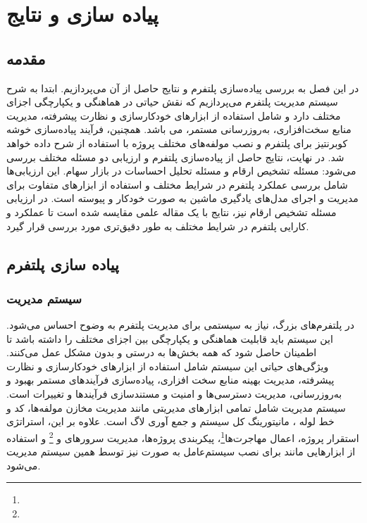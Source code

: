 \chapter{پیاده سازی و نتایج}

\section{مقدمه}
در این فصل به بررسی پیاده‌سازی پلتفرم و نتایج حاصل از آن می‌پردازیم. ابتدا به شرح سیستم مدیریت پلتفرم می‌پردازیم که نقش حیاتی در هماهنگی و یکپارچگی اجزای مختلف دارد و شامل استفاده از ابزارهای خودکارسازی و نظارت پیشرفته، مدیریت منابع سخت‌افزاری، به‌روزرسانی مستمر، می باشد. همچنین، فرآیند پیاده‌سازی خوشه کوبرنتیز برای پلتفرم  و نصب مولفه‌های مختلف پروژه با استفاده از  شرح داده خواهد شد. در نهایت، نتایج حاصل از پیاده‌سازی پلتفرم و ارزیابی دو مسئله مختلف بررسی می‌شود: مسئله تشخیص ارقام و مسئله تحلیل احساسات در بازار سهام. این ارزیابی‌ها شامل بررسی عملکرد پلتفرم در شرایط مختلف و استفاده از ابزارهای متفاوت برای مدیریت و اجرای مدل‌های یادگیری ماشین به صورت خودکار و پیوسته است. در ارزیابی مسئله تشخیص ارقام نیز، نتایج با یک مقاله علمی مقایسه شده است تا عملکرد و کارایی پلتفرم در شرایط مختلف به طور دقیق‌تری مورد بررسی قرار گیرد.
\section{پیاده سازی پلتفرم}
\subsection{سیستم مدیریت}

در پلتفرم‌های بزرگ، نیاز به سیستمی برای مدیریت پلتفرم به وضوح احساس می‌شود. این سیستم باید قابلیت هماهنگی و یکپارچگی بین اجزای مختلف را داشته باشد تا اطمینان حاصل شود که همه بخش‌ها به درستی و بدون مشکل عمل می‌کنند. ویژگی‌های حیاتی این سیستم شامل استفاده از ابزارهای خودکارسازی و نظارت پیشرفته، مدیریت بهینه منابع سخت افزاری، پیاده‌سازی فرآیندهای مستمر بهبود و به‌روزرسانی، مدیریت دسترسی‌ها و امنیت و مستندسازی فرآیندها و تغییرات است. سیستم مدیریت شامل تمامی ابزارهای مدیریتی مانند مدیریت مخازن مولفه‌ها، کد و خط لوله ، مانیتورینگ کل سیستم و جمع آوری لاگ است. علاوه بر این، استراتژی استقرار پروژه، اعمال مهاجرت‌ها\footnote{}، پیکربندی پروژه‌ها، مدیریت سرورهای  و \footnote{} و استفاده از ابزارهایی مانند  برای نصب سیستم‌عامل به صورت  نیز توسط همین سیستم مدیریت می‌شود.

